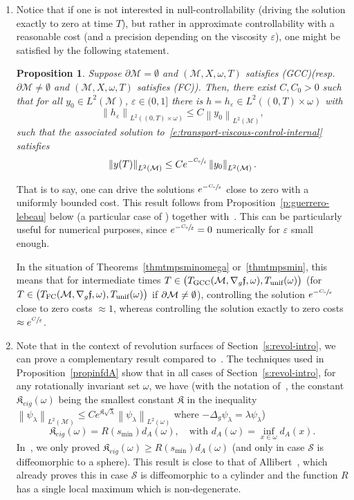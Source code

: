 \documentclass[JEP,XML,SOM,Unicode]{cedram}
\newcommand{\FC}{\textup{FC}}
\newcommand{\pFC}{\textup{(FC)}\xspace}
\newcommand{\GCC}{\textup{GCC}}
\newcommand{\pGCC}{\textup{(GCC)}\xspace}
\newcommand{\unif}{\textup{unif}}
\newtheorem{proposition}[lemma]{Proposition}
\theoremstyle{definition}
\newcommand{\M}{\ensuremath{\mathcal M}}
\newcommand{\calS}{\ensuremath{\mathcal S}}
\newcommand{\f}{\ensuremath{\mathfrak{f}}}
\newcommand\nor[2]{\left\|#1\right\|_{#2}}
\let\d\partial
\let\e\varepsilon
\let\eps\varepsilon
\begin{document}
\begin{enumerate}
\item Notice that if one is not interested in null-controllability (\ie driving the solution exactly to zero at time $T$), but rather in approximate controllability with a reasonable cost (and a precision depending on the viscosity $\eps$), one might be satisfied by the following statement.
\begin{proposition}
\label{p:guerrero-lebeau-control}
Suppose $\d\M= \emptyset$ and $(\M, X,\omega,T)$ satisfies \pGCC (resp.\ $\d\M \neq \emptyset$ and $(\M, X,\omega,T)$ satisfies \pFC). Then, there exist $C,C_0>0$ such that for all $y_0\in L^2(\M)$, $\eps \in (0,1]$ there is $h=h_\eps \in L^2((0,T)\times \omega)$ with
\[
\nor{h_\eps}{L^2((0,T)\times \omega)} \leq C \nor{y_0}{L^2(\M)},
\]
such that the associated solution to~\eqref{e:transport-viscous-control-internal} satisfies
\[
\nor{y(T)}{L^2(\M)} \leq Ce^{-\sfrac{C_{0}}{\e}} \nor{y_0}{L^2(\M)}.
\]
\end{proposition}
That is to say, one can drive the solutions $e^{-\sfrac{C_{0}}{\e}} $ close to zero with a uniformly bounded cost.
This result follows from Proposition~\ref{p:guerrero-lebeau} below (a particular case of \cite[Prop.\,3]{GL:07}) together with~\cite[App.]{LL:17approx}.
This can be particularly useful for numerical purposes, since $e^{-\sfrac{C_{0}}{\e}} = 0$ numerically for $\eps$ small enough.

In the situation of Theorems~\ref{thmtmpsminomega} or~\ref{thmtmpsmin}, this means that for intermediate times $T \in\nobreak \big(T_{\GCC}(\M, \nabla_g\f,\omega), T_{\unif}(\omega) \big)$ (\resp for $T \in \big(T_{\FC}(\M, \nabla_g\f,\omega), T_{\unif}(\omega) \big)$ if $\d\M \neq\nobreak \emptyset$), controlling the solution $e^{-\sfrac{C_{0}}{\e}}$ close to zero costs $\approx 1$, whereas controlling the solution exactly to zero costs $\approx e^{\sfrac{C}{\eps}}$.

\item Note that in the context of revolution surfaces of Section~\ref{s:revol-intro}, we can prove a complementary result compared to~\cite[Th.\,1.9/Cor.\,1.10]{LL:18}. The techniques used in Proposition~\ref{propinfdA} show that in all cases of Section~\ref{s:revol-intro}, for any rotationally invariant set $\omega$, we have (with the notation of~\cite{LL:18}, the constant $\mathfrak{K}_{eig}(\omega)$ being the smallest constant $\mathfrak{K}$ in the inequality $\nor{\psi_\lambda}{L^2(\M)} \leq Ce^{\mathfrak{K}\sqrt{\lambda}}\nor{\psi_\lambda}{L^2(\omega)}$ where $-\Delta_g \psi_\lambda = \lambda \psi_\lambda$)
\[
\mathfrak{K}_{eig}(\omega) = R(s_{\min}) d_A(\omega), \quad \text{with } d_A(\omega) = \inf_{x\in \omega} d_A(x).
\]
In~\cite{LL:18}, we only proved $\mathfrak{K}_{eig}(\omega) \geq R(s_{\min}) d_A(\omega)$ (and only in case $\calS$ is diffeomorphic to a sphere). This result is close to that of Allibert~\cite{Allibert:98}, which already proves this in case $\calS$ is diffeomorphic to a cylinder and the function $R$ has a single local maximum which is non-degenerate.
\end{enumerate}
\end{document}
